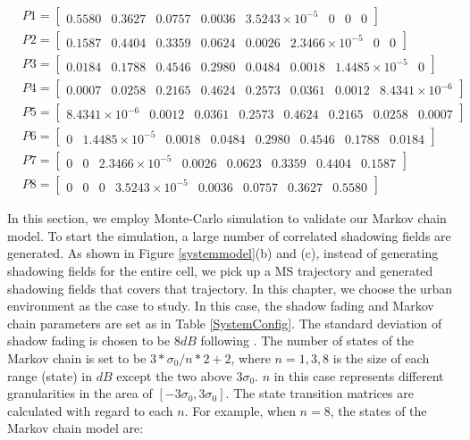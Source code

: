 \begin{equation}
\begin{split}
& P1=\begin{bmatrix}
0.5580 & 0.3627 & 0.0757 & 0.0036 & 3.5243\times10^{-5} & 0 & 0 & 0
\end{bmatrix}\\
& P2 = \begin{bmatrix}
0.1587 & 0.4404 & 0.3359 & 0.0624 & 0.0026 & 2.3466\times10^{-5} & 0 & 0 
\end{bmatrix}\\
& P3 = \begin{bmatrix}
0.0184 & 0.1788 & 0.4546 & 0.2980 & 0.0484 & 0.0018 & 1.4485\times10^{-5} & 0
\end{bmatrix}\\
& P4 = \begin{bmatrix}
0.0007 & 0.0258 & 0.2165 & 0.4624 & 0.2573 & 0.0361 & 0.0012 & 8.4341\times10^{-6}
\end{bmatrix}\\
& P5 = \begin{bmatrix}
8.4341\times10^{-6} & 0.0012 & 0.0361 & 0.2573 & 0.4624 & 0.2165 & 0.0258 & 0.0007
\end{bmatrix}\\
& P6 = \begin{bmatrix}
0 & 1.4485\times10^{-5} & 0.0018 & 0.0484 & 0.2980 & 0.4546 & 0.1788 & 0.0184
\end{bmatrix}\\
& P7 = \begin{bmatrix}
0 & 0 & 2.3466\times10^{-5} & 0.0026 & 0.0623 & 0.3359 & 0.4404 & 0.1587
\end{bmatrix}\\
& P8 = \begin{bmatrix}
0 & 0 & 0 & 3.5243\times10^{-5} & 0.0036 & 0.0757 & 0.3627 & 0.5580
\end{bmatrix}
\end{split}
\label{smallmatrix}
\end{equation}
\par In this section, we employ Monte-Carlo simulation to validate our Markov chain model. To start the simulation, a large number of correlated shadowing fields are generated. As shown in Figure \ref{systemmodel}(b) and (c), instead of generating shadowing fields for the entire cell, we pick up a MS trajectory and generated shadowing fields that covers that trajectory. In this chapter, we choose the urban environment as the case to study. In this case, the shadow fading and Markov chain parameters are set as in Table \ref{SystemConfig}. The standard deviation of shadow fading is chosen to be $8dB$ following \cite{szyszkowicz2010feasibility}. The number of states of the Markov chain is set to be $3*\sigma_{0}/n*2+2$, where $n=1,3,8$ is the size of each range (state) in $dB$ except the two above $3\sigma_{0}$. $n$ in this case represents different granularities in the area of $[-3\sigma_{0},3\sigma_{0}]$. The state transition matrices are calculated with regard to each $n$. For example, when $n=8$, the states of the Markov chain model are:
